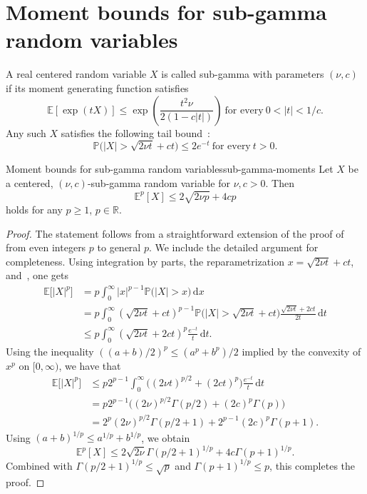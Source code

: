
\section{Moment bounds for sub-gamma random variables}

A real centered random variable $X$ is called sub-gamma with parameters $(\nu,c)$ if its moment generating function satisfies
\[
 \mathbb E[ \exp( tX ) ] \le \exp\left( \frac{ t^2 \nu}{2(1-c|t|)} \right) \ \text{for every} \ 0 < |t| < 1/c.
\]
Any such $X$ satisfies the following tail bound~\cite[P. 29]{boucheron-2013-concentration-inequalities}:
\begin{equation}
  \label{equ:subgammatail}
  \mathbb P\big(|X| > \sqrt{2\nu t} + ct\big) \le 2 e^{-t} \ \text{for every} \ t>0.
\end{equation}

\begin{lemma}{Moment bounds for sub-gamma random variables}{sub-gamma-moments}
    Let $X$ be a centered, $(\nu,c)$-sub-gamma random variable for $\nu,c>0$. Then
    \begin{equation}
        \mathbb{E}^p[X] \leq 2 \sqrt{2 \nu p} + 4 c p
    \end{equation}
    holds for any $p \geq 1$, $p \in \mathbb{R}$.
\end{lemma}
\begin{proof}
The statement follows from a straightforward extension of the proof of~\cite[Theorem 2.3]{boucheron-2013-concentration-inequalities} from  even integers $p$ to general $p$. We include the detailed argument for completeness. Using integration by parts, the reparametrization $x = \sqrt{2\nu t} + ct$, and~, one gets
\begin{align*}
 \mathbb{E}\big[|X|^p\big] &= p \int_0^\infty  |x|^{p-1} \mathbb P\big(|X| > x\big) \,\mathrm{d}x \\
 &=  p \int_0^\infty  (\sqrt{2\nu t} + ct)^{p-1} \mathbb P\big(|X| > \sqrt{2\nu t} + ct \big) \frac{ \sqrt{2\nu t} + 2ct}{2t} \,\mathrm{d}t \\
 &\le p  \int_0^\infty  (\sqrt{2\nu t} + 2ct)^{p}  \frac{e^{-t}}{t} \,\mathrm{d}t.
\end{align*}
Using the inequality $( (a+b)/2 )^p \le (a^p + b^p)/2$ implied by the convexity of $x^p$ on $[0,\infty)$,
we have that
\begin{align*}
 \mathbb{E}\big[|X|^p\big] & \le 
 p 2^{p-1}   \int_0^\infty  \big( (2\nu t)^{p/2} + (2ct)^{p}\big)  \frac{e^{-t}}{t} \,\mathrm{d}t \\
 &= p 2^{p-1} \big( (2\nu)^{p/2} \Gamma(p/2) + (2c)^p  \Gamma(p) \big) \\
 &= 2^{p} (2\nu)^{p/2} \Gamma(p/2+1) + 2^{p-1} (2c)^p  \Gamma(p+1).
\end{align*}
Using $(a+b)^{1/p} \le a^{1/p} + b^{1/p}$, we obtain
\[
\mathbb{E}^p[X] \leq 2 \sqrt{2\nu} \Gamma(p/2+1)^{1/p}  + 4 c \Gamma(p+1)^{1/p}.
\]
Combined with $\Gamma(p/2+1)^{1/p} \le \sqrt{p}$ and $\Gamma(p+1)^{1/p} \le p$, this completes the proof.
\end{proof}





